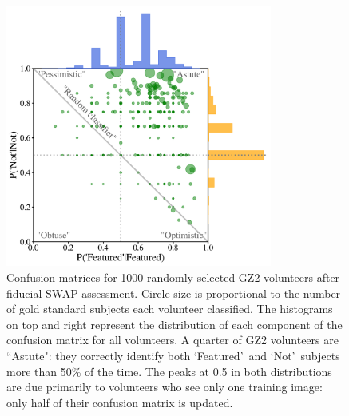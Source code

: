 \documentclass[twocolumn,  trackchanges, ]{aastex6}%
\newcommand{\feat}{`Featured'}
\newcommand{\notfeat}{`Not'}
\begin{document}
\begin{figure}[t!]
\includegraphics[width=3.45in]{f2.pdf}
\caption{Confusion matrices for 1000 randomly selected GZ2 volunteers after fiducial SWAP assessment. Circle size is proportional to the number of gold standard subjects each volunteer classified. The histograms on top and right represent the distribution of each component of the confusion matrix for all volunteers.  A quarter of GZ2 volunteers are ``Astute": they correctly identify both \feat~and \notfeat~subjects more than 50\% of the time. The peaks at 0.5 in both distributions are due primarily to volunteers who see only one training image: only half of their confusion matrix is updated. \label{fig: volunteer training}}
\end{figure}
\end{document}
